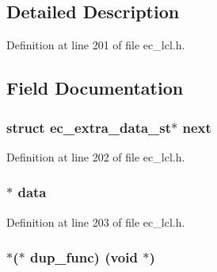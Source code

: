 \subsection{Detailed Description}


Definition at line 201 of file ec\+\_\+lcl.\+h.



\subsection{Field Documentation}
\subsubsection[{\texorpdfstring{next}{next}}]{\setlength{\rightskip}{0pt plus 5cm}struct {\bf ec\+\_\+extra\+\_\+data\+\_\+st}$\ast$ next}\hypertarget{structec__extra__data__st_a21a2567e894c42945403b43433460032}{}\label{structec__extra__data__st_a21a2567e894c42945403b43433460032}


Definition at line 202 of file ec\+\_\+lcl.\+h.

\subsubsection[{\texorpdfstring{data}{data}}]{$\ast$ data}\hypertarget{structec__extra__data__st_a735984d41155bc1032e09bece8f8d66d}{}\label{structec__extra__data__st_a735984d41155bc1032e09bece8f8d66d}


Definition at line 203 of file ec\+\_\+lcl.\+h.

\subsubsection[{\texorpdfstring{dup\+\_\+func}{dup_func}}]{$\ast$($\ast$ dup\+\_\+func) ({\bf void} $\ast$)}\hypertarget{structec__extra__data__st_a99a400c0f48769ab80d0cfd9dfed156a}{}\label{structec__extra__data__st_a99a400c0f48769ab80d0cfd9dfed156a}


